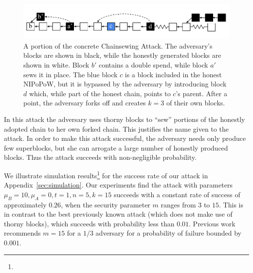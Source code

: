 \begin{figure}[h!]
	\begin{center}
		\includegraphics[width=\columnwidth]{figures/chainsew-concrete.pdf}
	\end{center}
	\caption{A portion of the concrete Chainsewing Attack. The adversary's blocks are shown in black, while the honestly generated blocks are shown in white. Block $b'$ contains a double spend, while block $a'$ sews it in place. The blue block $c$ is a block included in the honest NIPoPoW, but it is bypassed by the adversary by introducing block $d$ which, while part of the honest chain, points to $c$'s parent. After a point, the adversary forks off and creates $k = 3$ of their own blocks.}
	\label{fig:attack}
\end{figure}

In this attack the adversary uses thorny blocks to ``sew'' portions of the
honestly adopted chain to her own forked chain. This justifies the name given to
the attack.
In order to make this attack successful, the adversary needs only
produce few superblocks, but she can arrogate a large number of
honestly produced blocks. Thus the attack succeeds with non-negligible
probability.

We illustrate simulation results\footnote{\fi} for the success rate of our attack in Appendix~\ref{sec:simulation}. Our experiments find the attack with parameters $\mu_B = 10, \mu_A = 0, t = 1, n = 5, k = 15$ succeeds with a constant rate of success of approximately $0.26$, when the security parameter $m$ ranges from $3$ to $15$. This is in contrast to the best previously known attack (which does not make use of thorny blocks), which succeeds with probability less than $0.01$. Previous work recommends $m = 15$ for a $1/3$ adversary for a probability of failure bounded by $0.001$.

